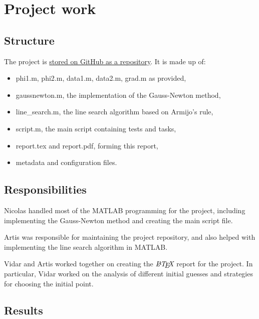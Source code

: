 \documentclass[12pt, a4paper]{article}
\begin{document}
\section{Project work}

\subsection{Structure}

The project is \href{https://github.com/artis-v/gauss-newton}{stored on GitHub as a repository}. It is made up of:\begin{itemize}
    \item phi1.m, phi2.m, data1.m, data2.m, grad.m as provided,
    \item gaussnewton.m, the implementation of the Gauss-Newton method,
    \item line\_search.m, the line search algorithm based on Armijo's rule,
    \item script.m, the main script containing tests and tasks,
    \item report.tex and report.pdf, forming this report,
    \item metadata and configuration files.
\end{itemize}

\subsection{Responsibilities}

Nicolas handled most of the MATLAB programming for the project, including implementing the Gauss-Newton method and creating the main script file.

Artis was responsible for maintaining the project repository, and also helped with implementing the line search algorithm in MATLAB.

Vidar and Artis worked together on creating the $\textit{\LaTeX}$ report for the project. In particular, Vidar worked on the analysis of different initial guesses and strategies for choosing the initial point.

\subsection{Results}
\end{document}
